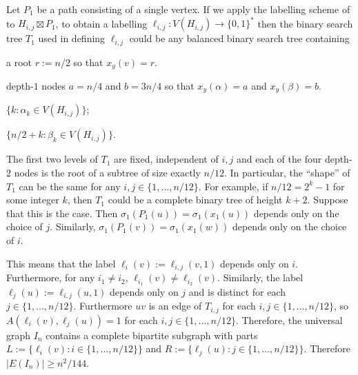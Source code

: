 \documentclass{patmorin}
\begin{document}
Let $P_1$ be a path consisting of a single vertex.  If we apply the labelling scheme of \citet{dujmovic.esperet.ea:adjacency} to $H_{i,j}\boxtimes P_1$, to obtain a labelling $\ell_{i,j}:V(H_{i,j})\to\{0,1\}^*$ then the binary search tree $T_{1}$ used in defining $\ell_{i,j}$ could be any balanced binary search tree containing
\begin{compactenum}
    \item a root $r:=n/2$ so that $x_y(v)=r$.
    \item depth-$1$ nodes $a=n/4$ and $b=3n/4$ so that $x_y(\alpha)=a$ and $x_y(\beta)=b$.
    \item $\{k:\alpha_k \in V(H_{i,j})\}$;
    \item $\{n/2+k:\beta_k\in V(H_{i,j})\}$.
\end{compactenum}

The first two levels of $T_1$ are fixed, independent of $i,j$ and each of the four depth-$2$ nodes is the root of a subtree of size exactly $n/12$. In particular, the ``shape'' of $T_{1}$ can be the same for any $i,j\in\{1,\ldots,n/12\}$.  For example, if $n/12=2^k-1$ for some integer $k$, then $T_1$ could be a complete binary tree of height $k+2$.  Suppose that this is the case.  Then $\sigma_1(P_1(u))=\sigma_1(x_1(u))$ depends only on the choice of $j$.  Similarly, $\sigma_1(P_1(v))=\sigma_1(x_1(w))$ depends only on the choice of $i$.

This means that the label $\ell_{i}(v):=\ell_{i,j}(v,1)$ depends only on $i$. Furthermore, for any $i_1\neq i_2$, $\ell_{i_1}(v)\neq\ell_{i_2}(v)$.
Similarly, the label $\ell_j(u):=\ell_{i,j}(u,1)$ depends only on $j$ and is distinct for each $j\in\{1,\ldots,n/12\}$.  Furthermore $uv$ is an edge of $T_{i,j}$ for each $i,j\in\{1,\ldots,n/12\}$, so $A(\ell_{i}(v),\ell_{j}(u))=1$ for each $i,j\in\{1,\ldots,n/12\}$. Therefore, the universal graph $I_n$ contains a complete bipartite subgraph with parts $L:=\{\ell_{i}(v):i\in\{1,\ldots,n/12\}\}$ and $R:=\{\ell_{j}(u):j\in\{1,\ldots,n/12\}\}$.  Therefore $|E(I_n)|\ge n^2/144$.
\end{document}
